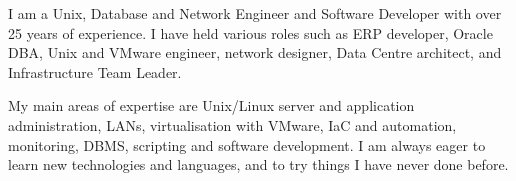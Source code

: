 
I am a Unix, Database and Network Engineer and Software Developer with over 25 years of experience. I have held various roles such as ERP developer, Oracle DBA, Unix and VMware engineer, network designer, Data Centre architect, and Infrastructure Team Leader.
\par
My main areas of expertise are Unix/Linux server and application administration, LANs, virtualisation with VMware, IaC and automation, monitoring, DBMS, scripting and software development. I am always eager to learn new technologies and languages, and to try things I have never done before.